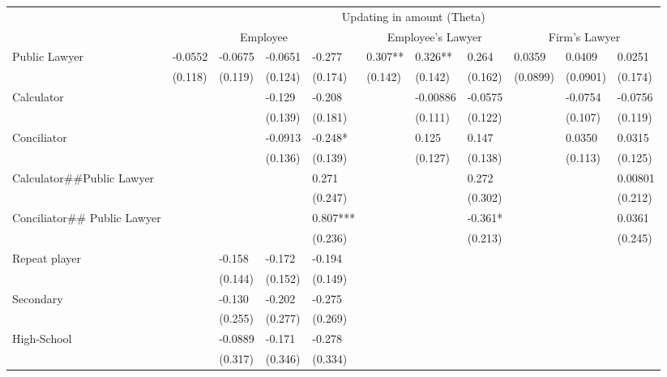 \begin{tabular}{lllllllllll}
\cmidrule{2-11}\multicolumn{1}{l|}{} & \multicolumn{10}{c|}{Updating in amount (Theta)} \\
\cmidrule{2-11}      & \multicolumn{4}{c}{Employee}  & \multicolumn{3}{c}{Employee's Lawyer} & \multicolumn{3}{c}{Firm's  Lawyer} \\
\cmidrule{2-11}Public Lawyer & -0.0552 & -0.0675 & -0.0651 & -0.277 & 0.307** & 0.326** & 0.264 & 0.0359 & 0.0409 & 0.0251 \\
      & (0.118) & (0.119) & (0.124) & (0.174) & (0.142) & (0.142) & (0.162) & (0.0899) & (0.0901) & (0.174) \\
Calculator &       &       & -0.129 & -0.208 &       & -0.00886 & -0.0575 &       & -0.0754 & -0.0756 \\
      &       &       & (0.139) & (0.181) &       & (0.111) & (0.122) &       & (0.107) & (0.119) \\
Conciliator &       &       & -0.0913 & -0.248* &       & 0.125 & 0.147 &       & 0.0350 & 0.0315 \\
      &       &       & (0.136) & (0.139) &       & (0.127) & (0.138) &       & (0.113) & (0.125) \\
Calculator\#\#Public Lawyer &       &       &       & 0.271 &       &       & 0.272 &       &       & 0.00801 \\
      &       &       &       & (0.247) &       &       & (0.302) &       &       & (0.212) \\
Conciliator\#\# Public Lawyer &       &       &       & 0.807*** &       &       & -0.361* &       &       & 0.0361 \\
      &       &       &       & (0.236) &       &       & (0.213) &       &       & (0.245) \\
Repeat player &       & -0.158 & -0.172 & -0.194 &       &       &       &       &       &  \\
      &       & (0.144) & (0.152) & (0.149) &       &       &       &       &       &  \\
Secondary &       & -0.130 & -0.202 & -0.275 &       &       &       &       &       &  \\
      &       & (0.255) & (0.277) & (0.269) &       &       &       &       &       &  \\
High-School &       & -0.0889 & -0.171 & -0.278 &       &       &       &       &       &  \\
      &       & (0.317) & (0.346) & (0.334) &       &       &       &       &       &  \\

\end{tabular}
